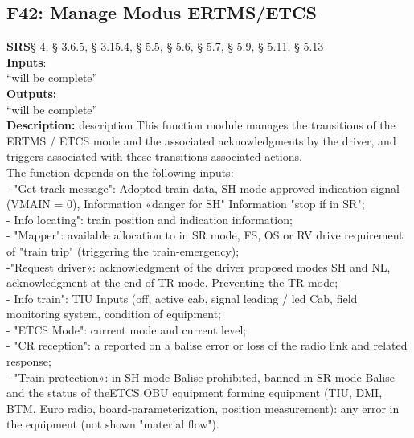 \documentclass{template/openetcs_report}
\begin{document}
 \subsection {F42: Manage Modus ERTMS/ETCS}
 \textbf{SRS}§ 4, § 3.6.5, § 3.15.4, § 5.5, § 5.6, § 5.7, § 5.9, § 5.11, § 5.13 \\
 
 \textbf{Inputs}:\\
``will be complete''\\
 
 \textbf{Outputs:}\\
 ``will be complete''\\
 
 \textbf{Description:} 
description 
This function module manages the transitions of the ERTMS / ETCS mode and the 
associated acknowledgments by the driver, and triggers associated with these transitions 
associated actions. \\

The function depends on the following inputs: \\

 - "Get track message": Adopted train data, SH mode approved indication signal 
(VMAIN = 0), Information «danger for SH" Information "stop if in SR"; \\

- Info locating": train position and indication information; \\

- "Mapper": available allocation to in SR mode, FS, OS or RV 
drive requirement of "train trip" (triggering the train-emergency); \\

-"Request driver»: acknowledgment of the driver 
proposed modes SH and NL, acknowledgment at the end of TR mode, 
Preventing the TR mode; \\

- Info train": TIU Inputs (off, active cab, signal leading / led 
Cab, field monitoring system, condition of equipment; \\

- "ETCS Mode": current mode and current level; \\

- "CR reception": a reported on a balise error or loss of the radio link 
and related response; \\

- "Train protection»: in SH mode Balise prohibited, banned in SR mode Balise 
and the status of theETCS OBU equipment forming equipment (TIU, DMI, 
BTM, Euro radio, board-parameterization, position measurement): any error in the equipment 
(not shown "material flow").\\
\end{document}
